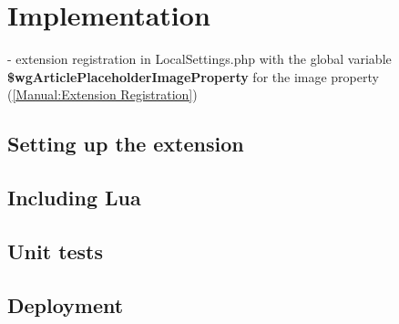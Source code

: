 	\section{Implementation}
	
	- extension registration in LocalSettings.php with the global variable \textbf{\$wgArticlePlaceholderImageProperty} for the image property (\href{https://www.mediawiki.org/wiki/Manual:Extension_registration}{[Manual:Extension Registration]})\\
	\subsection{Setting up the extension}
	
	
	
	
	\subsection{Including Lua}
	
	\subsection{Unit tests}
	\subsection{Deployment}
	
